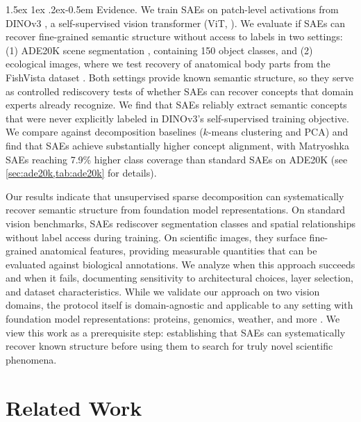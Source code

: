 \documentclass[10pt,twocolumn,letterpaper]{article}
\makeatletter
\renewcommand{\paragraph}{%
  \@startsection{paragraph}{4}%
  {\z@}{1.5ex \@plus 1ex \@minus .2ex}{-0.5em}%
  {\normalfont\normalsize\bfseries}%
}
\makeatother
\begin{document}
\paragraph{Evidence.}
We train SAEs on patch-level activations from DINOv3 \citep{simeoni2025dinov3}, a self-supervised vision transformer (ViT, \cite{dosovitskiy2020vit}).
We evaluate if SAEs can recover fine-grained semantic structure without access to labels in two settings: (1) ADE20K scene segmentation \citep{zhou2017ade20k}, containing \num{150} object classes, and (2) ecological images, where we test recovery of anatomical body parts from the FishVista dataset \citep{mehrab2024fishvista,fishvistadataset}.
Both settings provide known semantic structure, so they serve as controlled rediscovery tests of whether SAEs can recover concepts that domain experts already recognize.
We find that SAEs reliably extract semantic concepts that were never explicitly labeled in DINOv3's self-supervised training objective.
We compare against decomposition baselines ($k$-means clustering and PCA) and find that SAEs achieve substantially higher concept alignment, with Matryoshka SAEs \citep{bussmann2025matryoshka} reaching \num{7.9}\% higher class coverage than standard SAEs on ADE20K (see \cref{sec:ade20k,tab:ade20k} for details).

Our results indicate that unsupervised sparse decomposition can systematically recover semantic structure from foundation model representations.
On standard vision benchmarks, SAEs rediscover segmentation classes and spatial relationships without label access during training.
On scientific images, they surface fine-grained anatomical features, providing measurable quantities that can be evaluated against biological annotations.
We analyze when this approach succeeds and when it fails, documenting sensitivity to architectural choices, layer selection, and dataset characteristics.
While we validate our approach on two vision domains, the protocol itself is domain-agnostic and applicable to any setting with foundation model representations: proteins, genomics, weather, and more \citep{abramson2024alphafold3,lam2023graphcast,cui2024scgpt}.
We view this work as a prerequisite step: establishing that SAEs can systematically recover known structure before using them to search for truly novel scientific phenomena.

\section{Related Work}
\end{document}
